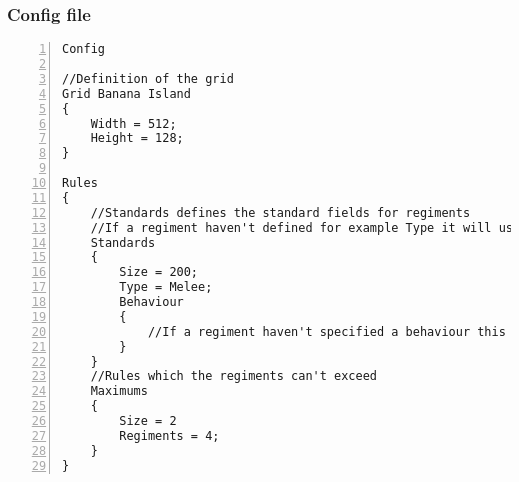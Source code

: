 		\subsubsection{Config file}
					\begin{lstlisting}[basicstyle=\small\sffamily,
					keywords={break,case,const,continue,default,else,enum,
					for,if,return,switch,while,do,long,void,int,float,double,
					char,struct,typedef,include,size\_t},
					keywordstyle={\color{blue}},
					comment={[l]{//}}, morecomment={[s]{/*}{*/}}, commentstyle=\itshape,
					columns={[l]flexible}, numbers=left, numberstyle=\tiny,
					frameround=fftt, frame=shadowbox, captionpos=b,
					caption={Config file},
					label=LST:code32]
Config

//Definition of the grid
Grid Banana Island
{
	Width = 512;
	Height = 128;
}

Rules
{
	//Standards defines the standard fields for regiments
	//If a regiment haven't defined for example Type it will use the Type in Standards
	Standards
	{
		Size = 200;
		Type = Melee;
		Behaviour
		{
			//If a regiment haven't specified a behaviour this behaviour will be used.
		}
	}
	//Rules which the regiments can't exceed
	Maximums
	{
		Size = 2
		Regiments = 4;
	}
}
\end{lstlisting}				
